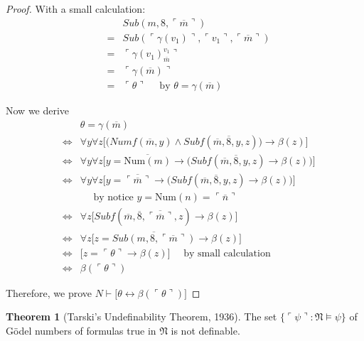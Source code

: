 \documentclass[11pt,letterpaper]{book}
\theoremstyle{definition}
\newtheorem{theorem}{Theorem}[section]
\begin{document}
\begin{proof}
With a small calculation:
\begin{eqnarray*}
& & Sub(m, 8, \ulcorner \overline{m} \urcorner) \\
& = & Sub( \ulcorner \gamma (v_1) \urcorner, \ulcorner v_1 \urcorner, \ulcorner \overline{m} \urcorner ) \\
& = & \ulcorner \gamma (v_1)_{\overline{m}} ^{ v_1 }  \urcorner \\
& = & \ulcorner \gamma (\overline{m}) \urcorner \\
& = & \ulcorner \theta \urcorner \quad \text{ by } \theta = \gamma (\overline{m})
\end{eqnarray*}

Now we derive
\begin{eqnarray*}
& & \theta = \gamma (\overline{m}) \\
& \iff & \forall y \forall z \bigg[ \big( Numf(\overline{m} , y) \land Subf(\overline{m}, \overline{8}, y, z ) \big) \rightarrow \beta(z) \bigg] \\
& \iff & \forall y \forall z \bigg[ y = \overline{\text{Num} (m) } \rightarrow \big(  Subf(\overline{m}, \overline{8}, y, z )  \rightarrow \beta(z) \big) \bigg] \\
& \iff & \forall y \forall z \bigg[ y = \overline{ \ulcorner \overline{m} \urcorner } \rightarrow \big(  Subf(\overline{m}, \overline{8}, y, z )  \rightarrow \beta(z) \big) \bigg]  \\
& & \quad \text{ by notice } y = \text{Num} (n) = \ulcorner \overline{n} \urcorner \\
& \iff & \forall z \bigg[  Subf(\overline{m}, \overline{8}, \overline{ \ulcorner \overline{m} \urcorner }, z )  \rightarrow \beta(z) \bigg] \\
& \iff &  \forall z \bigg[ z = \overline{ Sub(m, 8,  \ulcorner \overline{m} \urcorner ) } \rightarrow \beta(z) \bigg] \\
& \iff & \bigg[ z = \ulcorner \theta \urcorner \rightarrow \beta(z) \bigg] \quad \text{ by small calculation} \\
& \iff & \beta ( \ulcorner \theta \urcorner  )
\end{eqnarray*}

Therefore, we prove $N \vdash \big[ \theta \leftrightarrow \beta ( \ulcorner \theta \urcorner  ) \big]$

\end{proof}




\begin{theorem}[Tarski's Undefinability Theorem, 1936]
The set $\{ \ulcorner \psi \urcorner : \mathfrak{N} \models \psi \}$ of G\"odel numbers of formulas true in $\mathfrak{N}$ is not definable.
\label{theorem:tarski_undefinability}
\end{theorem}
\end{document}
